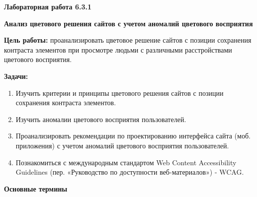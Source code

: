
\graphicspath{ {6.3.1/models/} }

\pagestyle{fancy}
\fancyhead{}
\renewcommand{\headrulewidth}{0pt}


\begin{center}
    \textbf{Лабораторная работа 6.3.1}

    \textbf{Анализ цветового решения сайтов с учетом аномалий цветового восприятия}
\end{center}

\textbf{Цель работы:} проанализировать цветовое решение сайтов с позиции сохранения контраста элементов при просмотре людьми с различными расстройствами цветового восприятия.
\bigskip

\textbf{Задачи:}

\begin{enumerate}
    \item Изучить критерии и принципы цветового решения сайтов с позиции сохранения контраста элементов.
    \item Изучить аномалии цветового восприятия пользователей. 
    \item Проанализировать рекомендации по проектированию интерфейса сайта (моб. приложения) с учетом аномалий цветового восприятия пользователей.
    \item Познакомиться с международным стандартом Web Content Accessibility Guidelines (пер. «Руководство по доступности веб-материалов») - WCAG.
\end{enumerate}
\bigskip

\textbf{Основные термины}

